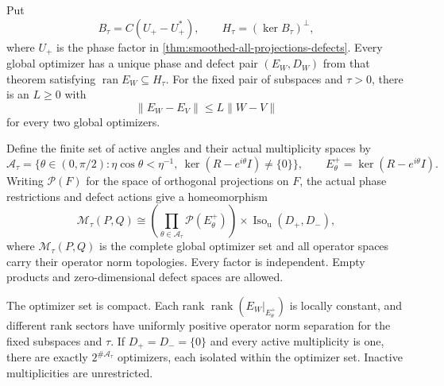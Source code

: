 \begin{theorem}
\label{thm:smoothed-effective-coordinates}
Put
\[
 B_\tau=C(U_+-U_+^*),\qquad H_\tau=(\ker B_\tau)^\perp,
\]
where $U_+$ is the phase factor in
\cref{thm:smoothed-all-projections-defects}.
Every global optimizer has a unique phase and defect pair $(E_W,D_W)$
from that theorem satisfying $\operatorname{ran}E_W\subseteq H_\tau$.
For the fixed pair of subspaces and $\tau>0$, there is an $L\geq0$ with
\[
 \|E_W-E_V\|\leq L\|W-V\|
\]
for every two global optimizers.

Define the finite set of active angles and their actual multiplicity spaces by
\[
 \mathcal A_\tau=\{\theta\in(0,\pi/2):
       \eta\cos\theta<\eta^{-1},\ \ker(R-e^{i\theta}I)\ne\{0\}\},
 \qquad E_\theta^+=\ker(R-e^{i\theta}I).
\]
Writing $\mathcal P(F)$ for the space of orthogonal projections on $F$,
the actual phase restrictions and defect actions give a homeomorphism
\[
 \mathcal M_\tau(P,Q)\cong
 \left(\prod_{\theta\in\mathcal A_\tau}\mathcal P(E_\theta^+)\right)
       \times\operatorname{Iso}_{\mathrm u}(D_+,D_-),
\]
where $\mathcal M_\tau(P,Q)$ is the complete global optimizer set and
all operator spaces carry their operator norm topologies. Every factor
is independent. Empty products and zero-dimensional defect spaces are allowed.

The optimizer set is compact. Each rank
$\operatorname{rank}(E_W|_{E_\theta^+})$ is locally constant, and different
rank sectors have uniformly positive operator norm separation for the
fixed subspaces and $\tau$. If $D_+=D_-=\{0\}$ and every active
multiplicity is one, there are exactly $2^{\#\mathcal A_\tau}$ optimizers,
each isolated within the optimizer set. Inactive multiplicities are unrestricted.
\end{theorem}

